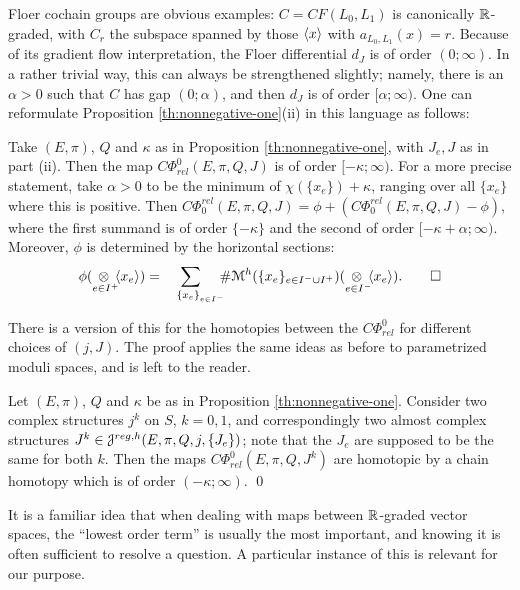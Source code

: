 \documentclass[10pt,letterpaper]{article}
\begin{document}
Floer cochain groups are obvious examples: $C = CF(L_0,L_1)$ is canonically
$\mathbb{R}$-graded, with $C_r$ the subspace spanned by those $\langle x \rangle$ with
$a_{L_0,L_1}(x) = r$. Because of its gradient flow interpretation, the Floer
differential $d_J$ is of order $(0;\infty)$. In a rather trivial way, this can
always be strengthened slightly; namely, there is an $\alpha>0$ such that $C$
has gap $(0;\alpha)$, and then $d_J$ is of order $[\alpha;\infty)$. One can
reformulate Proposition \ref{th:nonnegative-one}(ii) in this language as
follows:

\begin{lemma} \label{th:nonnegative-two}
Take $(E,\pi)$, $Q$ and $\kappa$ as in Proposition \ref{th:nonnegative-one},
with $J_e,J$ as in part (ii). Then the map $C\Phi^0_{rel}(E,\pi,Q,J)$ is of
order $[-\kappa;\infty)$. For a more precise statement, take $\alpha>0$ to be
the minimum of $\chi(\{x_e\})+\kappa$, ranging over all $\{x_e\}$ where this is
positive. Then $C\Phi_0^{rel}(E,\pi,Q,J) = \phi + (C\Phi_0^{rel}(E,\pi,Q,J) -
\phi)$, where the first summand is of order $\{-\kappa\}$ and the second of
order $[-\kappa+\alpha;\infty)$. Moreover, $\phi$ is determined by the
horizontal sections:
\[
\phi(\underset{e \in I^+\!\!}{\otimes} \gen{x_e}) =
 \sum_{\;\;\;\;\{x_e\}_{e \in I^-}\!\!\!\!} \#\MM^h(\{x_e\}_{e \in I^- \cup I^+})
 (\underset{e \in I^-\!\!}{\otimes} \gen{x_e}). \qed
\]
\end{lemma}

There is a version of this for the homotopies between the $C\Phi^0_{rel}$ for
different choices of $(j,J)$. The proof applies the same ideas as before to
parametrized moduli spaces, and is left to the reader.

\begin{lemma} \label{th:nonnegative-homotopy}
Let $(E,\pi)$, $Q$ and $\kappa$ be as in Proposition \ref{th:nonnegative-one}.
Consider two complex structures $j^k$ on $S$, $k = 0,1$, and correspondingly
two almost complex structures $J^k \in \mathcal{J}^{reg,h}(E,\pi,Q,j,\{J_e\})$; note
that the $J_e$ are supposed to be the same for both $k$. Then the maps
$C\Phi^0_{rel}(E,\pi,Q,J^k)$ are homotopic by a chain homotopy which is of
order $(-\kappa;\infty)$. \qed
\end{lemma}

It is a familiar idea that when dealing with maps between $\mathbb{R}$-graded vector
spaces, the ``lowest order term'' is usually the most important, and knowing it
is often sufficient to resolve a question. A particular instance of this is
relevant for our purpose.
\end{document}
